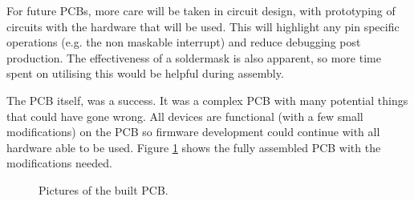 For future PCBs, more care will be taken in circuit design, with prototyping of circuits with the hardware that will be used. This will highlight any pin specific operations (e.g. the non maskable interrupt) and reduce debugging post production. The effectiveness of a soldermask is also apparent, so more time spent on utilising this would be helpful during assembly.

The PCB itself, was a success. It was a complex PCB with many potential things that could have gone wrong. All devices are functional (with a few small modifications) on the PCB so firmware development could continue with all hardware able to be used. Figure \ref{fig:PCB:Built} shows the fully assembled PCB with the modifications needed.

\begin{figure}
\centering
{}
\caption{Pictures of the built PCB.}
\label{fig:PCB:Built}
\end{figure}
